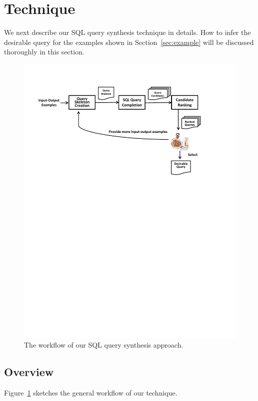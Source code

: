 
\section{Technique}
\label{sec:approach}



We next describe our SQL query synthesis technique in details.
How to infer the desirable query for the examples
shown in Section~\ref{sec:example} will
be discussed thoroughly in this section.

\begin{figure}[t]
  \centering
  \includegraphics[scale=0.53]{workflow}
  \vspace*{-5.0ex}\caption {{\label{fig:workflow} The workflow of our SQL query synthesis approach.
}}

\end{figure}

\subsection{Overview}
Figure~\ref{fig:workflow} sketches the general workflow of our technique.

